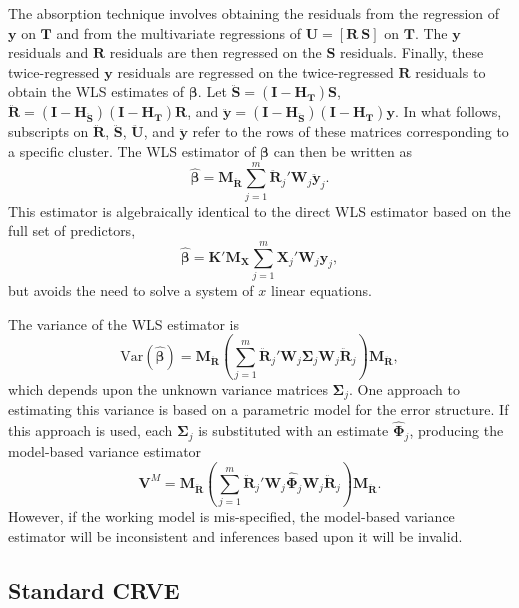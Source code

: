 \documentclass[12pt]{article}\usepackage[]{graphicx}\usepackage[]{color}
\newcommand{\Var}{\text{Var}}
\newcommand{\bm}{\mathbf}
\newcommand{\bs}{\boldsymbol}
\begin{document}
The absorption technique involves obtaining the residuals from the regression of $\bm{y}$ on $\bm{T}$ and from the multivariate regressions of $\bm{U} = [\bm{R}\ \bm{S}]$ on $\bm{T}$. 
The $\bm{y}$ residuals and $\bm{R}$ residuals are then regressed on the $\bm{S}$ residuals. 
Finally, these twice-regressed $\bm{y}$ residuals are regressed on the twice-regressed $\bm{R}$ residuals to obtain the WLS estimates of $\bs\beta$. 
Let $\bm{\ddot{S}} = \left(\bm{I} - \bm{H_T}\right)\bm{S}$, $\bm{\ddot{R}} = \left(\bm{I} - \bm{H_{\ddot{S}}}\right)\left(\bm{I} - \bm{H_T}\right)\bm{R}$, and $\bm{\ddot{y}} = \left(\bm{I} - \bm{H_{\ddot{S}}}\right)\left(\bm{I} - \bm{H_T}\right)\bm{y}$. 
In what follows, subscripts on $\bm{\ddot{R}}$, $\bm{\ddot{S}}$,  $\bm{\ddot{U}}$, and $\bm{\ddot{y}}$ refer to the rows of these matrices corresponding to a specific cluster. 
The WLS estimator of $\bs\beta$ can then be written as
\begin{equation}
\label{eq:WLS}
\bs{\hat\beta} = \bm{M_{\ddot{R}}} \sum_{j=1}^m \bm{\ddot{R}}_j' \bm{W}_j \bm{\ddot{y}}_j. 
\end{equation}
This estimator is algebraically identical to the direct WLS estimator based on the full set of predictors, \[
\bs{\hat\beta} = \bm{K}'\bm{M_X} \sum_{j=1}^m \bm{X}_j' \bm{W}_j \bm{y}_j,
\]
but avoids the need to solve a system of $x$ linear equations.

The variance of the WLS estimator is 
\begin{equation}
\label{eq:var_WLS}
\Var\left(\bs{\hat\beta}\right) = \bm{M_{\ddot{R}}}\left(\sum_{j=1}^m \bm{\ddot{R}}_j' \bm{W}_j \bs\Sigma_j \bm{W}_j\bm{\ddot{R}}_j\right) \bm{M_{\ddot{R}}},
\end{equation}
which depends upon the unknown variance matrices $\bm\Sigma_j$. 
One approach to estimating this variance is based on a parametric model for the error structure. 
If this approach is used, each $\bs\Sigma_j$ is substituted with an estimate $\bs{\hat\Phi}_j$, producing the model-based variance estimator
\begin{equation}
\label{eq:V_model}
\bm{V}^M = \bm{M_{\ddot{R}}}\left(\sum_{j=1}^m \bm{\ddot{R}}_j' \bm{W}_j \bs{\hat\Phi}_j \bm{W}_j\bm{\ddot{R}}_j\right) \bm{M_{\ddot{R}}}.
\end{equation}
However, if the working model is mis-specified, the model-based variance estimator will be inconsistent and inferences based upon it will be invalid.

\subsection{Standard CRVE}
\end{document}
